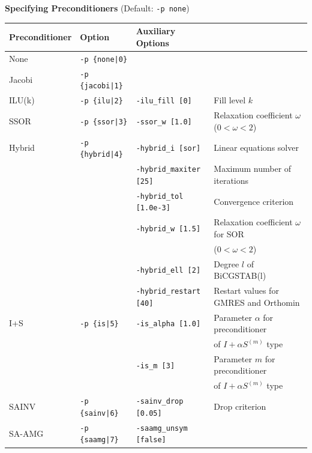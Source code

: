 \documentclass[a4paper]{article}
\begin{document}
\\ \\
\begin{minipage}[t]{\textwidth}
\begin{center}
{\bf Specifying Preconditioners} (Default: \verb=-p none=)\\
\begin{tabular}{l|lll}\hline\hline
Preconditioner   & Option           & Auxiliary Options \\ \hline
None     & \verb=-p {none|0}=    &   \\
Jacobi   & \verb=-p {jacobi|1}=  &     \\
ILU(k)   & \verb=-p {ilu|2}=     & \verb=-ilu_fill [0]=    & Fill level $k$ \\
SSOR     & \verb=-p {ssor|3}=    & \verb=-ssor_w [1.0]=    & Relaxation coefficient $\omega$ ($0<\omega<2$) \\
Hybrid   & \verb=-p {hybrid|4}=  & \verb=-hybrid_i [sor]=  & Linear
 equations solver\\
         &                       & \verb=-hybrid_maxiter [25]= & Maximum number of iterations \\
         &                       & \verb=-hybrid_tol [1.0e-3]= & Convergence criterion \\
         &                       & \verb=-hybrid_w [1.5]=      & Relaxation coefficient $\omega$ for SOR \\
         &                       &                             & ($0<\omega<2$) \\
         &                       & \verb=-hybrid_ell [2]=      & Degree $l$ of BiCGSTAB(l) \\
         &                       & \verb=-hybrid_restart [40]= & Restart values for GMRES and Orthomin \\
I+S      & \verb=-p {is|5}=      & \verb=-is_alpha [1.0]=  &  Parameter $\alpha$ for preconditioner \\
         &                       &                         &   of $I+\alpha S^{(m)}$ type \\
         &                       & \verb=-is_m [3]=        & Parameter $m$ for preconditioner \\
         &                       &                         &  of $I+\alpha S^{(m)}$ type \\
SAINV    & \verb=-p {sainv|6}=   & \verb=-sainv_drop [0.05]=    & Drop criterion\\
SA-AMG   & \verb=-p {saamg|7}=   & \verb=-saamg_unsym [false]=    &

\end{tabular}
\end{center}
\end{minipage}
\end{document}
